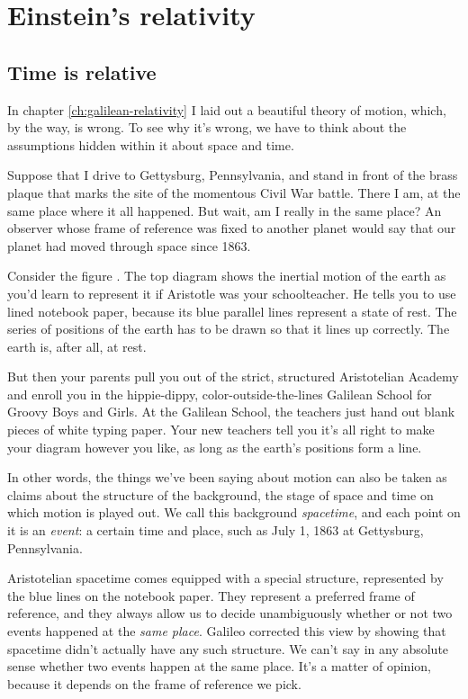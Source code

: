 \chapter{Einstein's relativity}

\section{Time is relative}

In chapter \ref{ch:galilean-relativity} I laid out a beautiful theory of motion, which,
by the way, is wrong. To see why it's wrong, we have to think about the assumptions hidden
within it about space and time.

Suppose that I drive to
Gettysburg, Pennsylvania, and stand in front of the brass plaque that marks the site of
the momentous Civil War battle. There I am, at the same place where it all happened.
But wait, am I really in the same place? An observer whose frame of
reference was fixed to another planet would say that our planet had moved through space since 1863.

\vfill\pagebreak

Consider the figure . The top diagram shows the inertial motion of the earth
as you'd learn to represent it if Aristotle was your schoolteacher. He tells you to use lined notebook
paper, because its blue parallel lines represent a state of rest. The series of positions of the earth
has to be drawn so that it lines up correctly. The earth is, after all, at rest.




But then your parents pull you out of the strict, structured Aristotelian Academy
and enroll you in the hippie-dippy,
color-outside-the-lines Galilean School for Groovy Boys and Girls.
At the Galilean School, the teachers just hand out blank pieces of white typing paper.
Your new teachers tell you it's all right to make your diagram however you like, as
long as the earth's positions form a line.

In other words, the things we've been saying about motion can also be taken as claims about
the structure of the background, the stage of space and time on which motion is played out.
We call this background \emph{spacetime}, and each point on it is an \emph{event}: a certain time and
place, such as July 1, 1863 at Gettysburg, Pennsylvania.

Aristotelian spacetime comes equipped with a special structure, represented by the blue
lines on the notebook paper. They represent a preferred frame of reference, and they always
allow us to decide unambiguously whether or not two events happened at the \emph{same place}.
Galileo corrected this view by showing that spacetime didn't actually have any such structure.
We can't say in any absolute sense whether two events happen at the same place. It's a matter
of opinion, because it depends on the frame of reference we pick.

